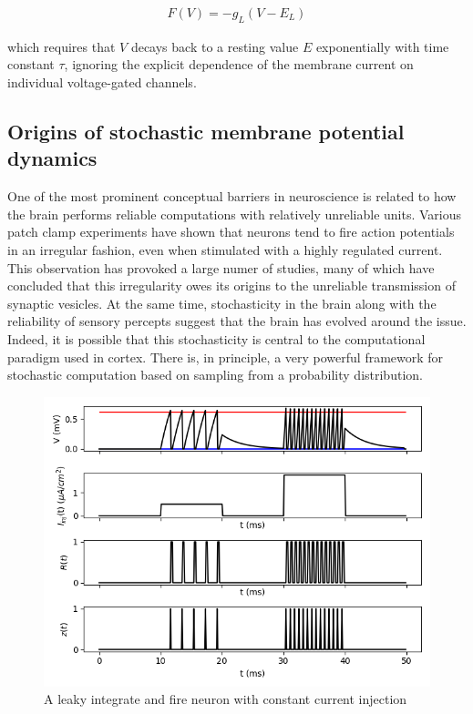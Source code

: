 \documentclass{ucetd}
\begin{document}
\begin{align*}
F(V) = -g_{L}(V-E_{L})
\end{align*}


which requires that $V$ decays back to a resting value $E$ exponentially with time constant $\tau$, ignoring the explicit dependence of the membrane current on individual voltage-gated channels.

\subsection{Origins of stochastic membrane potential dynamics}

One of the most prominent conceptual barriers in neuroscience is related to how the brain performs reliable computations with relatively unreliable units. Various patch clamp experiments have shown that neurons tend to fire action potentials in an irregular fashion, even when stimulated with a highly regulated current. This observation has provoked a large numer of studies, many of which have concluded that this irregularity owes its origins to the unreliable transmission of synaptic vesicles. At the same time, stochasticity in the brain along with the reliability of sensory percepts suggest that the brain has evolved around the issue. Indeed, it is possible that this stochasticity is central to the computational paradigm used in cortex. There is, in principle, a very powerful framework for stochastic computation based on sampling from a probability distribution.


\begin{figure}
\centering
\includegraphics[width=115mm]{fig_2-A}
\caption{A leaky integrate and fire neuron with constant current injection}
\end{figure}
\end{document}

